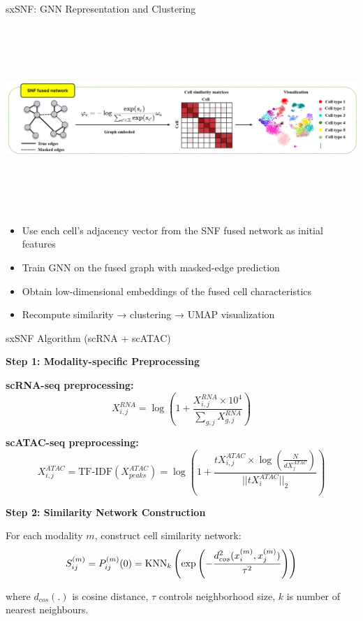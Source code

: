 \documentclass{beamer}
\begin{document}
\begin{frame}{sxSNF: GNN Representation and Clustering}

\centering
\includegraphics[width=1.0\textwidth,height=7cm,keepaspectratio]{./sxSNF_figure/Fig3b.jpg}

\vspace{0.1cm}

\scriptsize
\begin{itemize}
  \item Use each cell's adjacency vector from the SNF fused network as initial features
  \item Train GNN on the fused graph with masked-edge prediction
  \item Obtain low-dimensional embeddings of the fused cell characteristics
  \item Recompute similarity → clustering → UMAP visualization
\end{itemize}

\end{frame}







\begin{frame}{sxSNF Algorithm (scRNA + scATAC)}

\footnotesize
\textbf{Step 1: Modality-specific Preprocessing}

\textbf{scRNA-seq preprocessing:}
\[
X^{RNA}_{i,j} = \log\left(1 + \frac{X^{RNA}_{i,j} \times 10^4}{\sum_{g,j} X^{RNA}_{g,j}}\right)
\]

\textbf{scATAC-seq preprocessing:}
\[
X^{ATAC}_{i,j} = \text{TF-IDF}(X^{ATAC}_{peaks}) = \log\left(1 + \frac{tX^{ATAC}_{i,j} \times \log(\frac{N}{dX^{ATAC}_j})}{||tX^{ATAC}_i||_2}\right)
\]

\vspace{0.1cm}

\textbf{Step 2: Similarity Network Construction}

For each modality $m$, construct cell similarity network:
\[
S^{(m)}_{ij}=P^{(m)}_{ij}(0)={\rm KNN}_{k}\left(\exp\left(-\frac{d^2_{cos}(x^{(m)}_i, x^{(m)}_j)}{\tau^2}\right)\right)
\]

where $d_{cos}(.)$ is cosine distance, $\tau$ controls neighborhood size, $k$ is number of nearest neighbours.
\end{frame}
\end{document}
